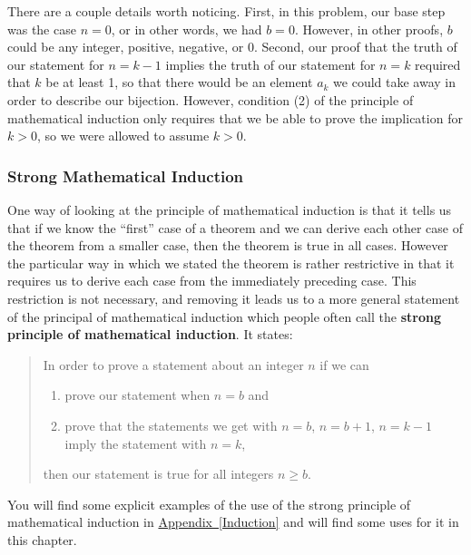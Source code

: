 \documentclass[10pt,]{book}
\newcommand{\terminology}[1]{\textbf{#1}}
\theoremstyle{plain}
\theoremstyle{definition}
\theoremstyle{definition}
\numberwithin{equation}{chapter}
\begin{document}
\par
\hypertarget{p-442}{}%
There are a couple details worth noticing. First, in this problem, our base step was the case \(n=0\), or in other words, we had \(b=0\). However, in other proofs, \(b\) could be any integer, positive, negative, or 0. Second, our proof that the truth of our statement for \(n=k-1\) implies the truth of our statement for \(n=k\) required that \(k\) be at least 1, so that there would be an element \(a_k\) we could take away in order to describe our bijection. However, condition (2) of the principle of mathematical induction only requires that we be able to prove the implication for \(k>0\), so we were allowed to assume \(k>0\).%
\typeout{************************************************}
\typeout{************************************************}
\subsubsection[{Strong Mathematical Induction}]{Strong Mathematical Induction}\label{subsubsection-1}
\hypertarget{p-443}{}%
One way of looking at the principle of mathematical induction is that it tells us that if we know the ``first'' case of a theorem and we can derive each other case of the theorem from a smaller case, then the theorem is true in all cases. However the particular way in which we stated the theorem is rather restrictive in that it requires us to derive each case from the immediately preceding case. This restriction is not necessary, and removing it leads us to a more general statement of the principal of mathematical induction which people often call the \terminology{strong principle of mathematical induction}. It states:%
\begin{quote}\hypertarget{blockquote-10}{}
\hypertarget{p-444}{}%
In order to prove a statement about an integer \(n\) if we can \leavevmode%
\begin{enumerate}
\item\hypertarget{li-10}{}\hypertarget{p-445}{}%
prove our statement when \(n=b\) and%
\item\hypertarget{li-11}{}\hypertarget{p-446}{}%
prove that the statements we get with \(n=b\), \(n=b+1\), \textellipsis{} \(n=k-1\) imply the statement with \(n=k\),%
\end{enumerate}
 then our statement is true for all integers \(n\ge b\).%
\end{quote}
\hypertarget{p-447}{}%
You will find some explicit examples of the use of the strong principle of mathematical induction in \hyperref[Induction]{Appendix~\ref{Induction}} and will find some uses for it in this chapter.%
\typeout{************************************************}
\typeout{************************************************}
\end{document}
